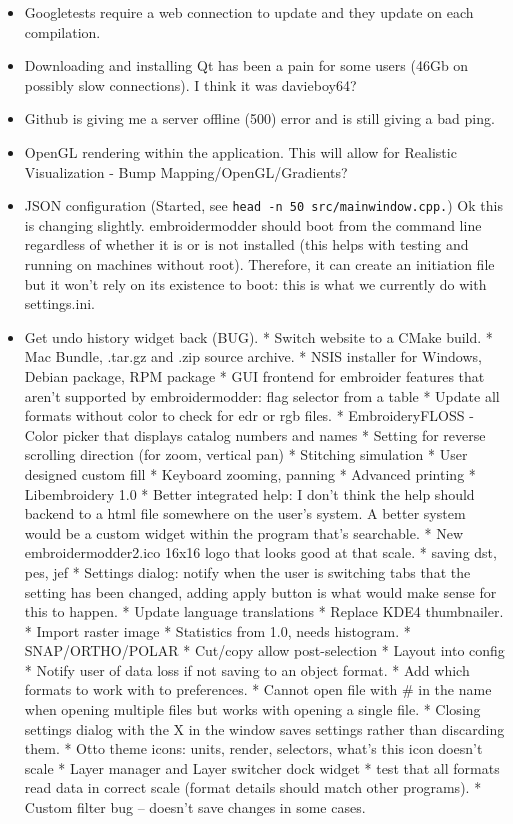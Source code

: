 \documentclass[a4paper]{report}
\begin{document}
\begin{itemize}
\item Googletests require a web connection to update and they update on each
      compilation.
\item Downloading and installing Qt has been a pain for some users (46Gb on
      possibly slow connections). I think it was davieboy64?
\item Github is giving me a server offline (500) error and is still giving a bad
      ping.
\item OpenGL rendering within the application. This will allow for Realistic
      Visualization - Bump Mapping/OpenGL/Gradients?
\item JSON configuration (Started, see \texttt{head\ -n\ 50\ src/mainwindow.cpp.})
      Ok this is changing slightly. embroidermodder should boot from the command
      line regardless of whether it is or is not installed (this helps with
      testing and running on machines without root). Therefore, it can create
      an initiation file but it won't rely on its existence to boot: this is
      what we currently do with settings.ini.
\item Get undo history widget back (BUG).
* Switch website to a CMake build.
* Mac Bundle, .tar.gz and .zip source archive.
* NSIS installer for Windows, Debian package, RPM package
* GUI frontend for embroider features that aren't supported by  embroidermodder: flag selector from a table
* Update all formats without color to check for edr or rgb files.
* EmbroideryFLOSS - Color picker that displays catalog numbers and names
* Setting for reverse scrolling direction (for zoom, vertical pan)
* Stitching simulation
* User designed custom fill
* Keyboard zooming, panning
* Advanced printing
* Libembroidery 1.0
* Better integrated help: I don't think the help should backend to a html file somewhere on the user's system. A better system would be a custom widget within the program that's searchable.
* New embroidermodder2.ico 16x16 logo that looks good at that scale.
* saving dst, pes, jef
* Settings dialog: notify when the user is switching tabs that the setting has been changed, adding apply button is what would make sense for this to happen.
* Update language translations
* Replace KDE4 thumbnailer.
* Import raster image
* Statistics from 1.0, needs histogram.
* SNAP/ORTHO/POLAR
* Cut/copy allow post-selection
* Layout into config
* Notify user of data loss if not saving to an object format.
* Add which formats to work with to preferences.
* Cannot open file with \# in the name when opening multiple files but  works
  with opening a single file.
* Closing settings dialog with the X in the window saves settings rather than discarding them.
* Otto theme icons: units, render, selectors, what's this icon doesn't scale
* Layer manager and Layer switcher dock widget
*  test that all formats read data in correct scale (format details should match other programs).
* Custom filter bug -- doesn't save changes in some cases.
\end{itemize}
\end{document}
